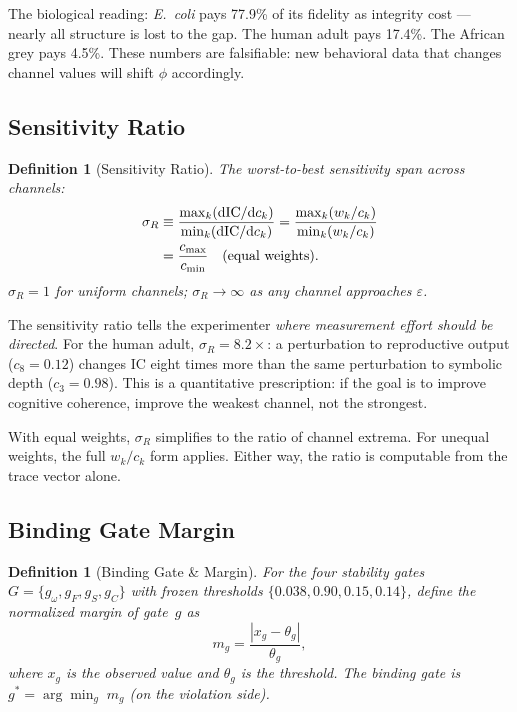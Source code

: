 \documentclass[
  aps,
  prd,
  twocolumn,
  superscriptaddress,
  nofootinbib,
  floatfix
]{revtex4-2}
\newtheorem{definition}[theorem]{Definition}
\newcommand{\eps}{\varepsilon}
\newcommand{\dd}{\mathrm{d}}
\newcommand{\beq}{\begin{equation}}
\newcommand{\eeq}{\end{equation}}
\newcommand{\IC}{\mathrm{IC}}
\begin{document}
The biological reading: \textit{E.~coli} pays 77.9\% of
its fidelity as integrity cost --- nearly all structure
is lost to the gap.  The human adult pays 17.4\%.  The
African grey pays 4.5\%.  These numbers are falsifiable:
new behavioral data that changes channel values will shift
$\phi$ accordingly.

\subsection{Sensitivity Ratio}

\begin{definition}[Sensitivity Ratio]\label{def:sensratio}
The worst-to-best sensitivity span across channels:
\begin{align}\label{eq:sensratio}
  \sigma_R &\equiv
    \frac{\max_k(\dd\IC/\dd c_k)}{\min_k(\dd\IC/\dd c_k)}
    = \frac{\max_k(w_k/c_k)}{\min_k(w_k/c_k)} \notag\\
    &= \frac{c_{\max}}{c_{\min}}
  \quad (\text{equal weights}).
\end{align}
$\sigma_R = 1$ for uniform channels; $\sigma_R \to \infty$
as any channel approaches $\eps$.
\end{definition}

The sensitivity ratio tells the experimenter \emph{where
measurement effort should be directed}.  For the human
adult, $\sigma_R = 8.2\times$: a perturbation to
reproductive output ($c_8 = 0.12$) changes $\IC$ eight
times more than the same perturbation to symbolic depth
($c_3 = 0.98$).  This is a quantitative prescription:
if the goal is to improve cognitive coherence, improve
the weakest channel, not the strongest.

With equal weights, $\sigma_R$ simplifies to the ratio
of channel extrema.  For unequal weights, the full
$w_k/c_k$ form applies.  Either way, the ratio is
computable from the trace vector alone.

\subsection{Binding Gate Margin}

\begin{definition}[Binding Gate \& Margin]\label{def:binding}
For the four stability gates $G = \{g_\omega, g_F, g_S, g_C\}$
with frozen thresholds $\{0.038, 0.90, 0.15, 0.14\}$,
define the normalized margin of gate~$g$ as
\beq\label{eq:margin}
  m_g = \frac{|x_g - \theta_g|}{\theta_g},
\eeq
where $x_g$ is the observed value and $\theta_g$ is the
threshold.  The \emph{binding gate} is
$g^* = \arg\min_g\; m_g$ (on the violation side).
\end{definition}
\end{document}
